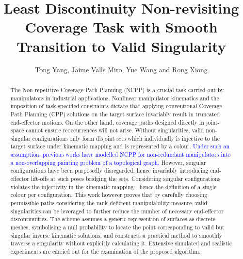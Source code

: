 \documentclass[Afour,sageh,times]{sagej}
\begin{document}

\title{Least Discontinuity Non-revisiting Coverage Task with Smooth Transition to Valid Singularity}

\author{Tong Yang, Jaime Valls Miro, Yue Wang and Rong Xiong}




\begin{abstract}
The Non-repetitive Coverage Path Planning (NCPP) is a crucial task carried out by manipulators in industrial applications. Nonlinear manipulator kinematics and the imposition of task-specified constraints dictate that applying conventional Coverage Path Planning (CPP) solutions on the target surface invariably result in truncated end-effector motions. 
On the other hand, coverage paths designed directly in joint-space cannot ensure reoccurrences will not arise. 
Without singularities, valid non-singular configurations only form disjoint sets which individually is injective to the target surface under kinematic mapping and is represented by a colour. 
\textcolor{blue}{Under such an assumption, previous works have modelled NCPP for non-redundant manipulators into a non-overlapping painting problem of a topological graph. }
However, singular configurations have been purposedly disregarded, hence invariably introducing end-effector lift-offs at such poses bridging the sets. 
Considering singular configurations violates the injectivity in the kinematic mapping - hence the definition of a single colour per configuration. 
This work however proves that by carefully choosing permissible paths considering the rank-deficient manipulability measure, valid singularities can be leveraged to further reduce the number of necessary end-effector discontinuities.
The scheme assumes a generic represention of surfaces as discrete meshes, symbolising a null probability to locate the point corresponding to valid but singular inverse kinematic solutions, and constructs a practical method to smoothly traverse a singularity without explicitly calculating it. 
Extensive simulated and realistic experiments are carried out for the examination of the proposed algorithm. 
\end{abstract}
\end{document}
